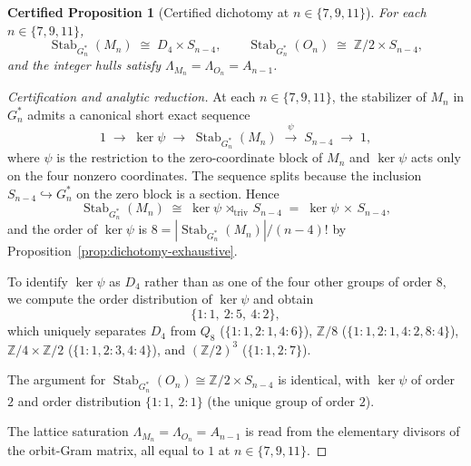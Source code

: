 \documentclass[11pt,a4paper]{article}
\newtheorem{certprop}[theorem]{Certified Proposition}
\theoremstyle{definition}
\theoremstyle{remark}
\providecommand{\Z}{\mathbb{Z}}
\providecommand{\Stab}{\operatorname{Stab}}
\begin{document}
\begin{certprop}[Certified dichotomy at $n \in \{7, 9, 11\}$]
\label{thm:dichotomy-analytic}
For each $n \in \{7, 9, 11\}$,
\begin{equation*}
   \Stab_{G^*_n}(M_n) \;\cong\; D_4 \times S_{n-4},
   \qquad
   \Stab_{G^*_n}(O_n) \;\cong\; \Z/2 \times S_{n-4},
\end{equation*}
and the integer hulls satisfy $\Lambda_{M_n} = \Lambda_{O_n} =
A_{n-1}$.
\end{certprop}

\begin{proof}[Certification and analytic reduction]
At each $n \in \{7,9,11\}$, the stabilizer of $M_n$ in $G^*_n$
admits a canonical short exact sequence
\begin{equation*}
   1 \;\to\; \ker \psi \;\to\; \Stab_{G^*_n}(M_n)
   \;\xrightarrow{\psi}\; S_{n-4} \;\to\; 1,
\end{equation*}
where $\psi$ is the restriction to the zero-coordinate block of $M_n$
and $\ker \psi$ acts only on the four nonzero coordinates. The
sequence splits because the inclusion $S_{n-4} \hookrightarrow
G^*_n$ on the zero block is a section. Hence
\begin{equation*}
   \Stab_{G^*_n}(M_n) \;\cong\; \ker \psi \,\rtimes_{\mathrm{triv}}\, S_{n-4}
   \;=\; \ker \psi \,\times\, S_{n-4},
\end{equation*}
and the order of $\ker \psi$ is $8 = |\Stab_{G^*_n}(M_n)| /
(n-4)!$ by Proposition~\ref{prop:dichotomy-exhaustive}.

To identify $\ker \psi$ as $D_4$ rather than as one of the four other
groups of order $8$, we compute the order distribution of $\ker \psi$
and obtain
\begin{equation*}
   \{1\!:\!1,\ 2\!:\!5,\ 4\!:\!2\},
\end{equation*}
which uniquely separates $D_4$ from $Q_8$ ($\{1\!:\!1, 2\!:\!1,
4\!:\!6\}$), $\Z/8$ ($\{1\!:\!1, 2\!:\!1, 4\!:\!2, 8\!:\!4\}$),
$\Z/4 \times \Z/2$ ($\{1\!:\!1, 2\!:\!3, 4\!:\!4\}$), and
$(\Z/2)^3$ ($\{1\!:\!1, 2\!:\!7\}$).

The argument for $\Stab_{G^*_n}(O_n) \cong \Z/2 \times S_{n-4}$ is
identical, with $\ker \psi$ of order $2$ and order distribution
$\{1\!:\!1,\ 2\!:\!1\}$ (the unique group of order $2$).

The lattice saturation $\Lambda_{M_n} = \Lambda_{O_n} = A_{n-1}$ is
read from the elementary divisors of the orbit-Gram matrix, all
equal to $1$ at $n \in \{7,9,11\}$.
\end{proof}
\end{document}
